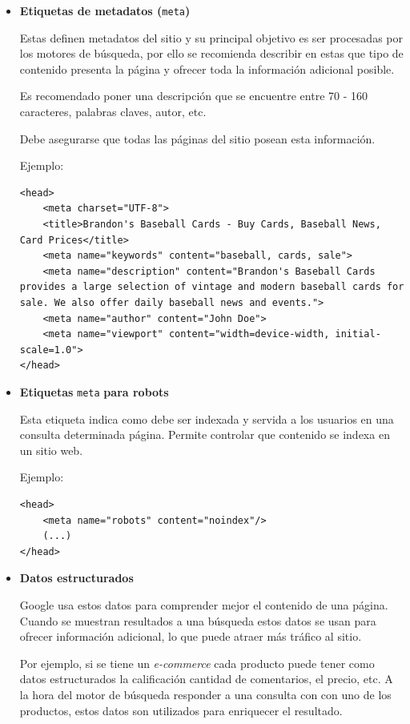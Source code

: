 \documentclass[12pt]{llncs}
\begin{document}
\begin{itemize}
\item \textbf{Etiquetas de metadatos (}\verb+meta+\textbf{)}

Estas definen metadatos del sitio y su principal objetivo es ser procesadas por los motores de búsqueda, por ello se recomienda describir en estas que tipo de contenido presenta la página y ofrecer toda la información adicional posible.

Es recomendado poner una descripción que se encuentre entre 70 - 160 caracteres, palabras claves, autor, etc.

Debe asegurarse que todas las páginas del sitio posean esta información.

Ejemplo:
\begin{lstlisting}
<head>
    <meta charset="UTF-8">
    <title>Brandon's Baseball Cards - Buy Cards, Baseball News, Card Prices</title>
    <meta name="keywords" content="baseball, cards, sale">
    <meta name="description" content="Brandon's Baseball Cards provides a large selection of vintage and modern baseball cards for sale. We also offer daily baseball news and events.">
    <meta name="author" content="John Doe">
    <meta name="viewport" content="width=device-width, initial-scale=1.0">
</head>
\end{lstlisting}

\item \textbf{Etiquetas} \verb+meta+  \textbf{para robots} \cite{meta_robots}

Esta etiqueta indica como debe ser indexada y servida a los usuarios en una consulta determinada página. Permite controlar que contenido se indexa en un sitio web.

Ejemplo:
\begin{lstlisting}
<head>
    <meta name="robots" content="noindex"/>
    (...)
</head>
\end{lstlisting}

\item \textbf{Datos estructurados} \cite{rich_results}

Google usa estos datos para comprender mejor el contenido de una página. Cuando se muestran resultados a una búsqueda estos datos se usan para ofrecer información adicional, lo que puede atraer más tráfico al sitio.

Por ejemplo, si se tiene un \textit{e-commerce} cada producto puede tener como datos estructurados la calificación cantidad de comentarios, el precio, etc. A la hora del motor de búsqueda responder a una consulta con con uno de los productos, estos datos son utilizados para enriquecer el resultado.


\end{itemize}
\end{document}
